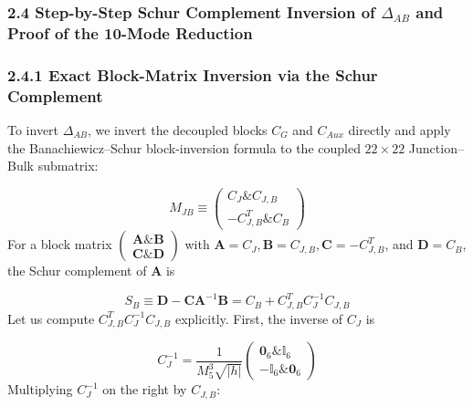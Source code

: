 \documentclass[aps,prd,onecolumn,superscriptaddress,nofootinbib,longbibliography,10pt]{revtex4-2}
\begin{document}
{{  
\subsubsection*{2.4 Step-by-Step Schur Complement Inversion of \(\Delta_{AB}\) and Proof of the 10-Mode Reduction}

  
\subsubsection*{2.4.1 Exact Block-Matrix Inversion via the Schur Complement}

  To invert \(\Delta_{AB}\), we invert the decoupled blocks \(C_G\) and \(C_{Aux}\) directly and apply the Banachiewicz–Schur block-inversion formula to the coupled \(22 \times 22\) Junction–Bulk submatrix:


  \[ M_{JB} \equiv \begin{pmatrix} C_J \& C_{J,B} \\ -C_{J,B}^T \& C_B \end{pmatrix} \]
  For a block matrix \(\begin{pmatrix} \mathbf{A} \& \mathbf{B} \\ \mathbf{C} \& \mathbf{D} \end{pmatrix}\) with \(\mathbf{A} = C_J, \mathbf{B} = C_{J,B}, \mathbf{C} = -C_{J,B}^T\), and \(\mathbf{D} = C_B\), the Schur complement of \(\mathbf{A}\) is


  \[ S_B \equiv \mathbf{D} - \mathbf{C}\mathbf{A}^{-1}\mathbf{B} = C_B + C_{J,B}^T C_J^{-1} C_{J,B} \]
  Let us compute \(C_{J,B}^T C_J^{-1} C_{J,B}\) explicitly. First, the inverse of \(C_J\) is


  \[ C_J^{-1} = \frac{1}{M_5^3\sqrt{|h|}}\begin{pmatrix} \mathbf{0}_6 \& \mathbb{I}_6 \\ -\mathbb{I}_6 \& \mathbf{0}_6 \end{pmatrix} \]
  Multiplying \(C_J^{-1}\) on the right by \(C_{J,B}\):


}}
\end{document}
